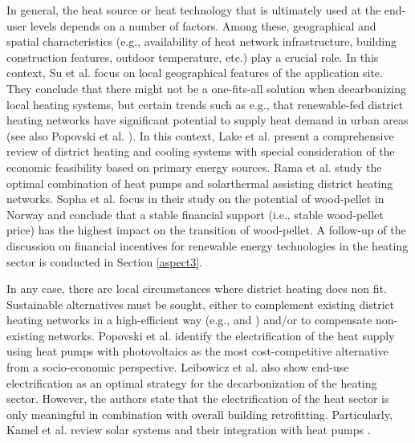 In general, the heat source or heat technology that is ultimately used at the end-user levels depends on a number of factors. Among these, geographical and spatial characteristics (e.g., availability of heat network infrastructure, building construction features, outdoor temperature, etc.) play a crucial role. In this context, Su et al. \cite{su2018heating} focus on local geographical features of the application site. They conclude that there might not be a one-fits-all solution when decarbonizing local heating systems, but certain trends such as e.g., that renewable-fed district heating networks have significant potential to supply heat demand in urban areas (see also Popovski et al. \cite{popovski2018technical}). In this context, Lake et al. \cite{lake2017review} present a comprehensive review of district heating and cooling systems with special consideration of the economic feasibility based on primary energy sources. Rama et al. \cite{rama2018introduction} study the optimal combination of heat pumps and solarthermal assisting district heating networks. Sopha et al. \cite{sopha2011exploring} focus in their study on the potential of wood-pellet in Norway and conclude that a stable financial support (i.e., stable wood-pellet price) has the highest impact on the transition of wood-pellet. A follow-up of the discussion on financial incentives for renewable energy technologies in the heating sector is conducted in Section \ref{aspect3}.\vspace{0.5cm}

In any case, there are local circumstances where district heating does non fit. Sustainable alternatives must be sought, either to complement existing district heating networks in a high-efficient way (e.g., \cite{rama2018introduction} and \cite{sopha2011exploring}) and/or to compensate non-existing networks. Popovski et al. \cite{popovski2018technical} identify the electrification of the heat supply using heat pumps with photovoltaics as the most cost-competitive alternative from a socio-economic perspective. Leibowicz et al. \cite{leibowicz2018optimal} also show end-use electrification as an optimal strategy for the decarbonization of the heating sector. However, the authors state that the electrification of the heat sector is only meaningful in combination with overall building retrofitting. Particularly, Kamel et al. review solar systems and their integration with heat pumps \cite{kamel2015solar}.\vspace{0.5cm}

